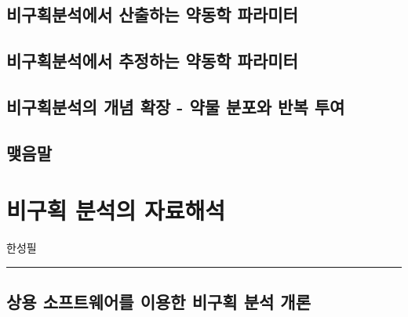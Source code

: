 \documentclass[
  11pt,
  krantz2, a4paper, twoside]{krantz}
\begin{document}
\hypertarget{uxbe44uxad6cuxd68duxbd84uxc11duxc5d0uxc11c-uxc0b0uxcd9cuxd558uxb294-uxc57duxb3d9uxd559-uxd30cuxb77cuxbbf8uxd130}{%
\section{비구획분석에서 산출하는 약동학 파라미터}\label{uxbe44uxad6cuxd68duxbd84uxc11duxc5d0uxc11c-uxc0b0uxcd9cuxd558uxb294-uxc57duxb3d9uxd559-uxd30cuxb77cuxbbf8uxd130}}

\hypertarget{uxbe44uxad6cuxd68duxbd84uxc11duxc5d0uxc11c-uxcd94uxc815uxd558uxb294-uxc57duxb3d9uxd559-uxd30cuxb77cuxbbf8uxd130}{%
\section{비구획분석에서 추정하는 약동학 파라미터}\label{uxbe44uxad6cuxd68duxbd84uxc11duxc5d0uxc11c-uxcd94uxc815uxd558uxb294-uxc57duxb3d9uxd559-uxd30cuxb77cuxbbf8uxd130}}

\hypertarget{uxbe44uxad6cuxd68duxbd84uxc11duxc758-uxac1cuxb150-uxd655uxc7a5---uxc57duxbb3c-uxbd84uxd3ecuxc640-uxbc18uxbcf5-uxd22cuxc5ec}{%
\section{비구획분석의 개념 확장 - 약물 분포와 반복 투여}\label{uxbe44uxad6cuxd68duxbd84uxc11duxc758-uxac1cuxb150-uxd655uxc7a5---uxc57duxbb3c-uxbd84uxd3ecuxc640-uxbc18uxbcf5-uxd22cuxc5ec}}

\hypertarget{uxb9fauxc74cuxb9d0-1}{%
\section{맺음말}\label{uxb9fauxc74cuxb9d0-1}}

\hypertarget{nca-analysis}{%
\chapter{비구획 분석의 자료해석}\label{nca-analysis}}

\Large\hfill

한성필
\normalsize

\begin{center}\rule{0.5\linewidth}{0.5pt}\end{center}

\hypertarget{uxc0c1uxc6a9-uxc18cuxd504uxd2b8uxc6e8uxc5b4uxb97c-uxc774uxc6a9uxd55c-uxbe44uxad6cuxd68d-uxbd84uxc11d-uxac1cuxb860}{%
\section{상용 소프트웨어를 이용한 비구획 분석 개론}\label{uxc0c1uxc6a9-uxc18cuxd504uxd2b8uxc6e8uxc5b4uxb97c-uxc774uxc6a9uxd55c-uxbe44uxad6cuxd68d-uxbd84uxc11d-uxac1cuxb860}}
\end{document}
